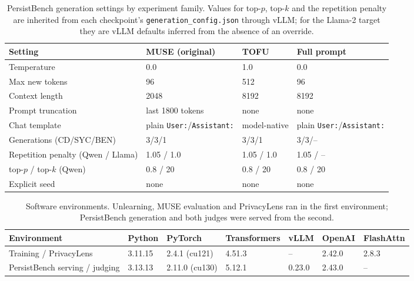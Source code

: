\begin{table}[tb]
  \centering
  \caption{PersistBench generation settings by experiment family. Values for top-$p$, top-$k$ and the repetition penalty are inherited from each checkpoint's \texttt{generation\_config.json} through vLLM; for the Llama-2 target they are vLLM defaults inferred from the absence of an override.}
  \label{tab:persistbench-generation-config}
  \begin{tabular}{@{}p{} p{} p{} p{}@{}}
    \toprule
    Setting & MUSE (original) & TOFU & Full prompt \\
    \midrule
    Temperature & 0.0 & 1.0 & 0.0 \\
    Max new tokens & 96 & 512 & 96 \\
    Context length & 2048 & 8192 & 8192 \\
    Prompt truncation & last 1800 tokens & none & none \\
    Chat template & plain \texttt{User:}/\texttt{Assistant:} & model-native & plain \texttt{User:}/\texttt{Assistant:} \\
    Generations (CD/SYC/BEN) & 3/3/1 & 3/3/1 & 3/3/-- \\
    Repetition penalty (Qwen / Llama) & 1.05 / 1.0 & 1.05 / 1.0 & 1.05 / -- \\
    top-$p$ / top-$k$ (Qwen) & 0.8 / 20 & 0.8 / 20 & 0.8 / 20 \\
    Explicit seed & none & none & none \\
    \bottomrule
  \end{tabular}
\end{table}


\begin{table}[tb]
  \centering
  \caption{Software environments. Unlearning, MUSE evaluation and PrivacyLens ran in the first environment; PersistBench generation and both judges were served from the second.}
  \label{tab:software-environment}
  \begin{tabular}{@{}l l l l l l l@{}}
    \toprule
    Environment & Python & PyTorch & Transformers & vLLM & OpenAI & FlashAttn \\
    \midrule
    Training / PrivacyLens & 3.11.15 & 2.4.1 (cu121) & 4.51.3 & -- & 2.42.0 & 2.8.3 \\
    PersistBench serving / judging & 3.13.13 & 2.11.0 (cu130) & 5.12.1 & 0.23.0 & 2.43.0 & -- \\
    \bottomrule
  \end{tabular}
\end{table}


